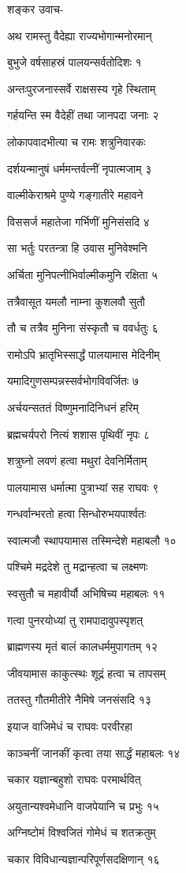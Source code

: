 शङ्कर उवाच-

अथ रामस्तु वैदेह्या राज्यभोगान्मनोरमान्

बुभुजे वर्षसाहस्रं पालयन्सर्वतोदिशः १

अन्तःपुरजनास्सर्वे राक्षसस्य गृहे स्थिताम्

गर्हयन्ति स्म वैदेहीं तथा जानपदा जनाः २

लोकापवादभीत्या च रामः शत्रुनिवारकः

दर्शयन्मानुषं धर्ममन्तर्वत्नीं नृपात्मजाम् ३

वाल्मीकेराश्रमे पुण्ये गङ्गातीरे महावने

विससर्ज महातेजा गर्भिणीं मुनिसंसदि ४

सा भर्तुः परतन्त्रा हि उवास मुनिवेश्मनि

अर्चिता मुनिपत्नीभिर्वाल्मीकमुनि रक्षिता ५

तत्रैवासूत यमलौ नाम्ना कुशलवौ सुतौ

तौ च तत्रैव मुनिना संस्कृतौ च ववर्धतुः ६

रामोऽपि भ्रातृभिस्सार्द्धं पालयामास मेदिनीम्

यमादिगुणसम्पन्नस्सर्वभोगविवर्जितः ७

अर्चयन्सततं विष्णुमनादिनिधनं हरिम्

ब्रह्मचर्यपरो नित्यं शशास पृथिवीं नृपः ८

शत्रुघ्नो लवणं हत्वा मथुरां देवनिर्मिताम्

पालयामास धर्मात्मा पुत्राभ्यां सह राघवः ९

गन्धर्वान्भरतो हत्वा सिन्धोरुभयपार्श्वतः

स्वात्मजौ स्थापयामास तस्मिन्देशे महाबलौ १०

पश्चिमे मद्रदेशे तु मद्रान्हत्वा च लक्ष्मणः

स्वसुतौ च महावीर्यौ अभिषिच्य महाबलः ११

गत्वा पुनरयोध्यां तु रामपादावुपस्पृशत्

ब्राह्मणस्य मृतं बालं कालधर्ममुपागतम् १२

जीवयामास काकुत्स्थः शूद्रं हत्वा च तापसम्

ततस्तु गौतमीतीरे नैमिषे जनसंसदि १३

इयाज वाजिमेधं च राघवः परवीरहा

काञ्चनीं जानकीं कृत्वा तया सार्द्धं महाबलः १४

चकार यज्ञान्बहुशो राघवः परमार्थवित्

अयुतान्यश्वमेधानि वाजपेयानि च प्रभुः १५

अग्निष्टोमं विश्वजितं गोमेधं च शतक्रतुम्

चकार विविधान्यज्ञान्परिपूर्णसदक्षिणान् १६

